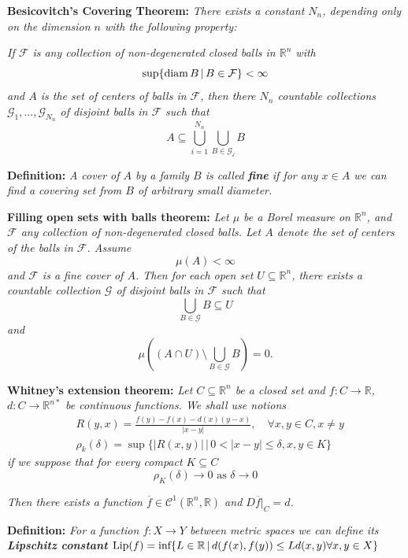 \vspace{2ex}
\textbf{Besicovitch’s Covering Theorem:} \textit{There exists a constant $N_n$, depending
only on the dimension $n$ with the following property:}

\vspace{1ex} \textit{
If $\mathcal{F}$ is any collection of non-degenerated closed balls in
$\mathbb{R}^n$ with
\[\sup\{\textnormal{diam}\,B\,|\,B\in\mathcal F\}<\infty\]
and $A$ is the set of centers of balls in $\mathcal F$, then there $N_n$
countable collections $\mathcal{G}_1,\ldots,\mathcal{G}_{N_n}$ of disjoint
balls in $\mathcal{F}$ such that
\[A\subseteq\bigcup_{i=1}^{N_n}\bigcup_{B\in\mathcal{G_i}}B\]}

\vspace{2ex}
\textbf{Definition:} \textit{A cover of $A$ by a family $B$ is called \textbf{fine}
if for any $x\in A$ we can find a covering set from $B$ of arbitrary small
diameter.}

\vspace{2ex}
\textbf{Filling open sets with balls theorem:} \textit{Let $\mu$ be a Borel measure on
$\mathbb{R}^n$, and $\mathcal{F}$ any collection of non-degenerated closed balls.
Let $A$ denote the set of centers of the balls in $\mathcal F$. Assume
\[\mu(A)<\infty\]
and $\mathcal F$ is a fine cover of $A$. Then for each open set $U\subseteq\mathbb{R}^n$, there
exists a countable collection $\mathcal G$ of disjoint balls in $\mathcal F$ such that
\[\bigcup_{B\in\mathcal G} B\subseteq U\]
and
\[\mu\left((A\cap U)\setminus\bigcup_{B\in\mathcal G}B\right)=0.\]}

\vspace{2ex}
\textbf{Whitney's extension theorem:}\textit{
Let $C\subseteq \mathbb{R}^n$ be a closed set and $f:C\rightarrow\mathbb R$,
$d:C\rightarrow\mathbb{R}^{n*}$ be continuous functions. We shall use notions}
\begin{align*}
    &R(y,x)=\frac{f(y)-f(x)-d(x)(y-x)}{|x-y|},\quad\forall x,y\in C, x\neq y \\
    &\rho_k(\delta)=\sup\{|R(x,y)|\, |\, 0<|x-y|\leq\delta, x, y\in K\}
\end{align*}
\textit{if we suppose that for every compact $K\subseteq C$}
\[
\rho_K(\delta)\rightarrow 0\text{ as }\delta\rightarrow 0
\]

\textit{Then there exists a function $\overline f\in\mathcal{C}^1(\mathbb{R}^n,\mathbb{R})$
and $D\overline f|_C=d$.}

\vspace{2ex}
\textbf{Definition:} \textit{For a function $f:X\rightarrow Y$ between metric spaces we can
define its \textbf{Lipschitz constant} $\text{Lip}(f) = \textnormal{inf}\{L\in
\mathbb{R}\,|\,d(f(x),f(y))\leq Ld(x,y) \forall x,y\in X\}$}

